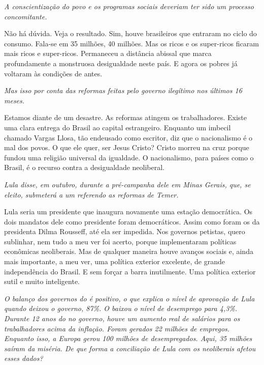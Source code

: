 \itshape
 A conscientização do povo e os programas sociais
deveriam ter sido um processo concomitante.

\normalfont
Não há dúvida. Veja o resultado. Sim, houve brasileiros
que entraram no ciclo do consumo. Fala-se em 35 milhões, 40 milhões. Mas
os ricos e os super-ricos ficaram mais ricos e super-ricos. Permaneceu a
distância abissal que marca profundamente a monstruosa desigualdade
neste país. E agora os pobres já voltaram às condições de antes.

\itshape
 Mas isso por conta das reformas feitas pelo governo
ilegítimo nos últimos 16 meses.

\normalfont
Estamos diante de um desastre. As reformas atingem os
trabalhadores. Existe uma clara entrega do Brasil ao capital
estrangeiro. Enquanto um imbecil chamado Vargas Llosa, tão endeusado
como escritor, diz que o nacionalismo é o mal dos povos. O que ele quer,
ser Jesus Cristo? Cristo morreu na cruz porque fundou uma religião
universal da igualdade. O nacionalismo, para países como o Brasil, é o
recurso contra a desigualdade neoliberal.

\itshape
 Lula disse, em outubro, durante a pré-campanha dele em
Minas Gerais, que, se eleito, submeterá a um referendo as reformas de
Temer.

\normalfont
Lula seria um presidente que inaugura novamente uma
estação democrática. Os dois mandatos dele como presidente foram
democráticos. Assim como foram os da presidenta Dilma Rousseff, até ela
ser impedida. Nos governos petistas, quero sublinhar, nem tudo a meu ver
foi acerto, porque implementaram políticas econômicas neoliberais. Mas
de qualquer maneira houve avanços sociais e, ainda mais importante, a
meu ver, uma política exterior excelente, de grande independência do
Brasil. E sem forçar a barra inutilmente. Uma política exterior sutil e
muito inteligente.

\itshape
 O balanço dos governos do  é positivo, o que explica
o nível de aprovação de Lula quando deixou o governo, 87\%. O  baixou
o nível de desemprego para 4,3\%. Durante 12 anos do  no governo,
houve um aumento real de salários para os trabalhadores acima da
inflação. Foram gerados 22 milhões de empregos. Enquanto isso, a Europa
gerou 100 milhões de desempregados. Aqui, 35 milhões saíram da miséria.
De que forma a conciliação de Lula com os neoliberais afetou esses
dados?

